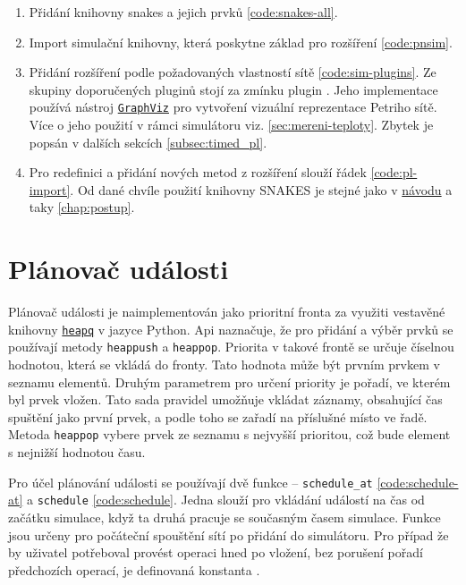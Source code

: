 \begin{enumerate}
 \item Přidání knihovny snakes a jejich prvků \ref{code:snakes-all}.
 \item Import simulační knihovny, která poskytne základ pro rozšíření \ref{code:pnsim}.
 \item Přidání rozšíření podle požadovaných vlastností sítě \ref{code:sim-plugins}. Ze skupiny doporučených pluginů stojí za zmínku plugin \href{https://www.ibisc.univ-evry.fr/~fpommereau/SNAKES/API/plugins/gv.html}{}. Jeho implementace používá nástroj \href{https://www.graphviz.org/}{\texttt{GraphViz}} pro vytvoření vizuální reprezentace Petriho sítě. Více o jeho použití v rámci simulátoru viz. \ref{sec:mereni-teploty}. Zbytek je popsán v dalších sekcích \ref{subsec:timed_pl}.
 \item Pro redefinici a přidání nových metod z rozšíření slouží řádek \ref{code:pl-import}. Od dané chvíle použití knihovny SNAKES je stejné jako v \href{https://www.ibisc.univ-evry.fr/~fpommereau/SNAKES/first-steps-with-snakes.html}{návodu} a taky \ref{chap:postup}.
\end{enumerate}


\section{Plánovač události}
\label{sec:event-planner}

Plánovač události je naimplementován jako prioritní fronta za využiti vestavěné knihovny \href{https://docs.python.org/3/library/heapq.html}{\texttt{heapq}} v jazyce Python. Api naznačuje, že pro přidání a výběr prvků se používají metody \texttt{heappush} a \texttt{heappop}. Priorita v takové frontě se určuje číselnou hodnotou, která se vkládá do fronty. Tato hodnota může být prvním prvkem v seznamu elementů. Druhým parametrem pro určení priority je pořadí, ve kterém byl prvek vložen. Tato sada pravidel umožňuje vkládat záznamy, obsahující čas spuštění jako první prvek, a podle toho se zařadí na příslušné místo ve řadě. Metoda \texttt{heappop} vybere prvek ze seznamu s nejvyšší prioritou, což bude element s nejnižší hodnotou času.

Pro účel plánování události se používají dvě funkce -- \texttt{schedule\_at} \ref{code:schedule-at} a \texttt{schedule} \ref{code:schedule}. Jedna slouží pro vkládání událostí na čas od začátku simulace, když ta druhá pracuje se současným časem simulace. Funkce jsou určeny pro počáteční spouštění sítí po přidání do simulátoru. Pro případ že by uživatel potřeboval provést operaci hned po vložení, bez porušení pořadí předchozích operací, je definovaná konstanta .

